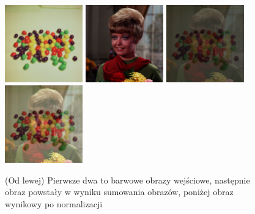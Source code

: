 \documentclass[final,a4paper,openany,12pt]{mwbk}
\begin{document}
\begin{figure}[H]
	\begin{center}
		\includegraphics[width=0.3\textwidth]{2/2Color_Sum_Img1_Original}
		\includegraphics[width=0.3\textwidth]{2/2Color_Sum_Img2_Original}
		\includegraphics[width=0.3\textwidth]{2/2Color_Sum_Img_Result}
		\includegraphics[width=0.3\textwidth]{2/2Color_Sum_Img_Result_Norm}
	\end{center}
	\caption{(Od lewej) Pierwsze dwa to barwowe obrazy wejściowe, następnie obraz powstały w wyniku sumowania obrazów, poniżej obraz wynikowy po normalizacji }
\end{figure}
\end{document}

